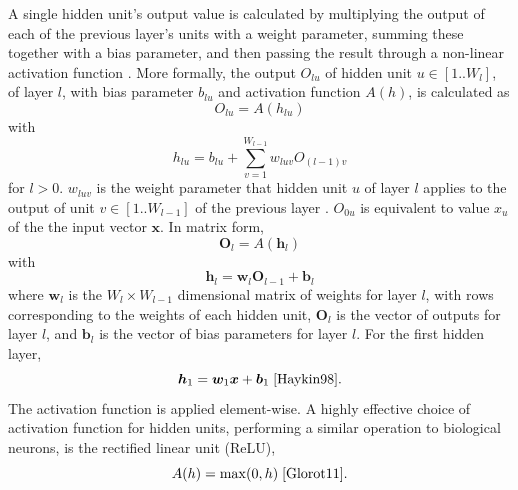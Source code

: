 \documentclass[12pt]{article}
\begin{document}
A single hidden unit's output value is calculated by multiplying the output of each of the previous layer's units with a weight parameter, summing these together with a bias parameter, and then passing the result through a non-linear activation function \cite{Rumelhart86}. More formally, the output $O_{lu}$ of hidden unit $u\in[1..W_l]$, of layer $l$, with bias parameter $b_{lu}$ and activation function $A(h)$, is calculated as
\begin{equation}
O_{lu}=A(h_{lu})
\end{equation}
with
\begin{equation}
h_{lu}=b_{lu}+\sum_{v=1}^{W_{l-1}}w_{luv}O_{(l-1)v}
\end{equation}
for $l > 0$. $w_{luv}$ is the weight parameter that hidden unit $u$ of layer $l$ applies to the output of unit $v\in[1..W_{l-1}]$ of the previous layer \cite{Haykin98}. $O_{0u}$ is equivalent to value $x_u$ of the the input vector $\bm{x}$. In matrix form,
\begin{equation}
\bm{O}_l=A(\bm{h}_l)
\end{equation}
with
\begin{equation}
\bm{h}_l=\bm{w}_l\bm{O}_{l-1}+\bm{b}_l
\end{equation}
where $\bm{w}_l$ is the $W_l \times W_{l-1}$ dimensional matrix of weights for layer $l$, with rows corresponding to the weights of each hidden unit, $\bm{O}_l$ is the vector of outputs for layer $l$, and $\bm{b}_l$ is the vector of bias parameters for layer $l$. For the first hidden layer,
\begin{equation}
\bm{h}_1=\bm{w}_1\bm{x}+\bm{b}_1\; \cite{Haykin98}.
\end{equation}
The activation function is applied element-wise. A highly effective choice of activation function for hidden units, performing a similar operation to biological neurons, is the rectified linear unit (ReLU),
\begin{equation}
A(h)=\mathrm{max}(0,h)\; \cite{Glorot11}.
\end{equation}
\end{document}
